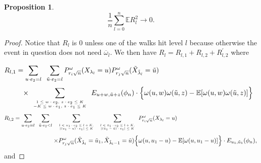 \documentclass[11pt]{amsart}
\newtheorem{proposition}[theorem]{\sc Proposition}
\begin{document}
\begin{proposition}
\label{prop1}
\[\frac{1}{n} \sum_{l=0}^{n} \mathbb{E} R_l^2  \longrightarrow 0 .\]
\end{proposition}
\begin{proof}  
 Notice that $R_l$ is $0$ unless one of the walks hit level $l$ because otherwise the event in question does not need $\overline{\omega}_{l}$. We then have $R_l=R_{l,1}+R_{l,2} + R_{l,2}^{'}$ where
 
\[ R_{l,1} = \sum_{u\cdot e_2 =l} \hspace{0.2cm}\sum_{\tilde{u} \cdot e_2 =l} P_{r_i \sqrt{n}}^{\omega}(X_{\lambda_l}=u)P_{r_j \sqrt{n}}^{\omega}(\tilde{X}_{\tilde{\lambda}_l}=\tilde{u})  \hspace{5cm}\] \[ \qquad \times \sum_{\begin{tiny}\begin{array}{c}1\le w\cdot e_2\mbox{, } z\cdot e_2  \leq K \\
 -K \le w\cdot e_1\mbox{, } z\cdot e_1  \leq K \end{array}\end{tiny} } E_{u+w,\tilde{u}+z} (\phi_n)  \cdot \Big{\lbrace}\omega(u,w)\omega(\tilde{u},z) -\mathbb{E}[\omega(u,w)\omega(\tilde{u},z)]\Big{\rbrace}  \]
\[ R_{l,2} = \sum_{u\cdot e_2 =l}\hspace{0.2cm} \sum_{\tilde{u} \cdot e_2 <l} \hspace{0.2cm} \sum_{\begin{tiny}\begin{array}{c}l < u_1\cdot e_2 \leq l+K,\\ |(u_1-u)\cdot e_1| \leq K\end{array}\end{tiny}}   \sum_{\begin{tiny} \begin{array}{c}l < \tilde{u}_1\cdot e_2 \leq l+K,\\ |(\tilde{u}_1-\tilde{u})\cdot e_1| \leq K \end{array} \end{tiny}}  P_{r_i \sqrt{n}}^{\omega}(X_{\lambda_l} =u)  \hspace{5cm}\]
\[\qquad \qquad \qquad  \qquad  \times  P_{r_j \sqrt{n}}^{\omega}(\tilde{X}_{\tilde{\lambda}_l}=\tilde{u}_1, \tilde{X}_{\tilde{\lambda}_l -1}=\tilde{u} )  \Big{\lbrace}\omega(u,u_1-u)-\mathbb{E}[\omega(u,u_1-u)] \Big{\rbrace} \cdot E_{u_1,\tilde{u}_1}(\phi_n), \]
and

\end{proof}
\end{document}
